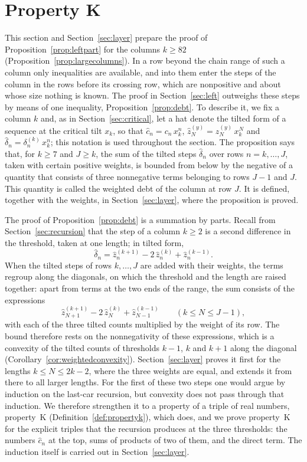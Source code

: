 \documentclass{amsart}
\theoremstyle{definition}
\theoremstyle{remark}
\numberwithin{equation}{section}
\begin{document}
\section{Property K}\label{sec:propk}
This section and Section~\ref{sec:layer} prepare the proof of Proposition~\ref{prop:leftpart} for the columns $k\ge 82$ (Proposition~\ref{prop:largecolumns}). In a row beyond the chain range of such a column only inequalities are available, and into them enter the steps of the column in the rows before its crossing row, which are nonpositive and about whose size nothing is known. The proof in Section~\ref{sec:left} outweighs these steps by means of one inequality, Proposition~\ref{prop:debt}. To describe it, we fix a column $k$ and, as in Section~\ref{sec:critical}, let a hat denote the tilted form of a sequence at the critical tilt $x_k$, so that $\hat c_n=c_n\,x_k^{n}$, $\hat z^{(y)}_N=z^{(y)}_N\,x_k^{N}$ and $\hat\delta_n=\delta^{(k)}_n\,x_k^{n}$; this notation is used throughout the section. The proposition says that, for $k\ge 7$ and $J\ge k$, the sum of the tilted steps $\hat\delta_n$ over rows $n=k,\dots,J$, taken with certain positive weights, is bounded from below by the negative of a quantity that consists of three nonnegative terms belonging to rows $J-1$ and $J$. This quantity is called the weighted debt of the column at row $J$. It is defined, together with the weights, in Section~\ref{sec:layer}, where the proposition is proved.

The proof of Proposition~\ref{prop:debt} is a summation by parts. Recall from Section~\ref{sec:recursion} that the step of a column $k\ge 2$ is a second difference in the threshold, taken at one length; in tilted form,
\[
\hat\delta_n=\hat z^{(k+1)}_n-2\,\hat z^{(k)}_n+\hat z^{(k-1)}_n .
\]
When the tilted steps of rows $k,\dots,J$ are added with their weights, the terms regroup along the diagonals, on which the threshold and the length are raised together: apart from terms at the two ends of the range, the sum consists of the expressions
\[
\hat z^{(k+1)}_{N+1}-2\,\hat z^{(k)}_N+\hat z^{(k-1)}_{N-1}\qquad(k\le N\le J-1),
\]
with each of the three tilted counts multiplied by the weight of its row. The bound therefore rests on the nonnegativity of these expressions, which is a convexity of the tilted counts of thresholds $k-1$, $k$ and $k+1$ along the diagonal (Corollary~\ref{cor:weightedconvexity}). Section~\ref{sec:layer} proves it first for the lengths $k\le N\le 2k-2$, where the three weights are equal, and extends it from there to all larger lengths. For the first of these two steps one would argue by induction on the last-car recursion, but convexity does not pass through that induction. We therefore strengthen it to a property of a triple of real numbers, property~K (Definition~\ref{def:propertyk}), which does, and we prove property~K for the explicit triples that the recursion produces at the three thresholds: the numbers $\hat c_n$ at the top, sums of products of two of them, and the direct term. The induction itself is carried out in Section~\ref{sec:layer}.
\end{document}
